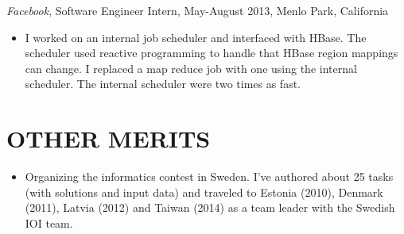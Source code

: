 \documentclass[11pt]{res} %
\begin{document}
\begin{resume}
\emph{Facebook}, {\footnotesize Software Engineer Intern, May-August 2013}, Menlo Park, California
\vspace{0.2in}
   \begin{itemize}
   \item I worked on an internal job scheduler and interfaced with HBase. The
     scheduler used reactive programming to handle that HBase region mappings
     can change. I replaced a map reduce job with one using the internal
     scheduler. The internal scheduler were two times as fast.
 \end{itemize}


\section{OTHER MERITS}

   \begin{itemize} %
   \item Organizing the informatics contest in Sweden.  I've authored about
     25 tasks (with solutions and input data) and traveled to Estonia (2010),
     Denmark (2011), Latvia (2012) and Taiwan (2014) as a team leader with the Swedish IOI
     team.
 \end{itemize}

\end{resume}
\end{document}
